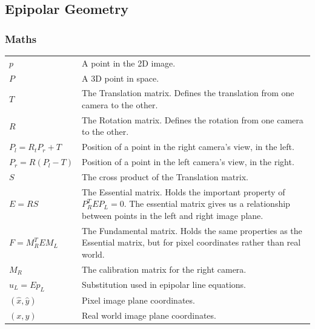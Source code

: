 \documentclass{article}
\begin{document}
    \subsection{Epipolar Geometry}
        \subsubsection{Maths}
        \begin{center}
            \begin{tabular}{l p{10cm}}
                $p$ & A point in the 2D image. \\
                
                $P$ & A 3D point in space. \\
                
                $T$ & The Translation matrix. Defines the translation from one camera to the other. \\
                
                $R$ & The Rotation matrix. Defines the rotation from one camera to the other. \\
                
                $P_l = R_tP_r + T$ & Position of a point in the right camera's view, in the left. \\
                $P_r = R(P_l - T)$ & Position of a point in the left camera's view, in the right. \\
                
                $S$ & The cross product of the Translation matrix. \\
                
                $E = RS$ & The Essential matrix. Holds the important property of $P_R^T E P_L = 0$. The essential matrix gives us a relationship between points in the left and right image plane. \\
                
                $F = M^T_R E M_L$ & The Fundamental matrix. Holds the same properties as the Essential matrix,  but for pixel coordinates rather than real world. \\
                
                $M_R$ & The calibration matrix for the right camera. \\

                $u_L = Ep_L$ & Substitution used in epipolar line equations. \\

                $(\hat{x},\hat{y})$ & Pixel image plane coordinates. \\
                
                $(x,y)$ & Real world image plane coordinates. \\


            \end{tabular}
        \end{center}
\end{document}
